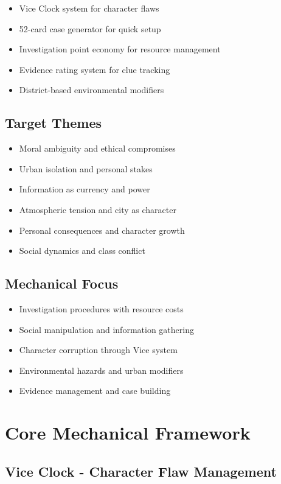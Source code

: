 \documentclass[11pt]{article}
\begin{document}
\begin{itemize}
\item Vice Clock system for character flaws
\item 52-card case generator for quick setup
\item Investigation point economy for resource management
\item Evidence rating system for clue tracking
\item District-based environmental modifiers
\end{itemize}

\subsection{Target Themes}

\begin{itemize}
\item Moral ambiguity and ethical compromises
\item Urban isolation and personal stakes
\item Information as currency and power
\item Atmospheric tension and city as character
\item Personal consequences and character growth
\item Social dynamics and class conflict
\end{itemize}

\subsection{Mechanical Focus}

\begin{itemize}
\item Investigation procedures with resource costs
\item Social manipulation and information gathering
\item Character corruption through Vice system
\item Environmental hazards and urban modifiers
\item Evidence management and case building
\end{itemize}

\section{Core Mechanical Framework}

\subsection{Vice Clock - Character Flaw Management}
\end{document}
